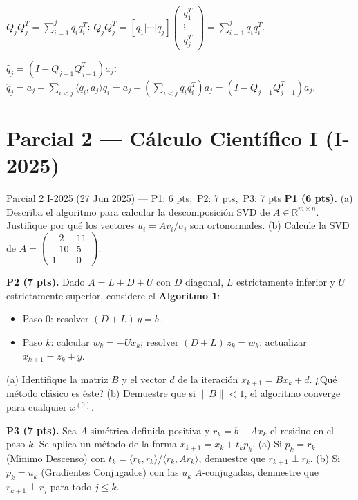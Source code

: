 \documentclass[11pt,a4paper]{article}
\begin{document}
\textbf{$Q_jQ_j^T = \sum_{i=1}^j q_iq_i^T$:}
$Q_jQ_j^T=[q_1|\cdots|q_j]\begin{pmatrix}q_1^T\\\vdots\\q_j^T\end{pmatrix}
=\sum_{i=1}^j q_iq_i^T$.

\textbf{$\hat{q}_j = (I-Q_{j-1}Q_{j-1}^T)a_j$:}
$\hat{q}_j = a_j - \sum_{i<j}\langle q_i,a_j\rangle q_i
= a_j - \left(\sum_{i<j}q_iq_i^T\right)a_j = (I-Q_{j-1}Q_{j-1}^T)a_j$.

\section{Parcial 2 --- Cálculo Científico I (I-2025)}
\label{sec:parcial2025}

\begin{examen}{Parcial 2 I-2025 (27 Jun 2025) --- P1: 6 pts,\ P2: 7 pts,\ P3: 7 pts}
\textbf{P1 (6 pts).} (a) Describa el algoritmo para calcular la descomposición SVD de $A\in\mathbb{R}^{m\times n}$. Justifique por qué los vectores $u_i=Av_i/\sigma_i$ son ortonormales. (b) Calcule la SVD de $A=\begin{pmatrix}-2&11\\-10&5\\1&0\end{pmatrix}$.

\smallskip\textbf{P2 (7 pts).} Dado $A=L+D+U$ con $D$ diagonal, $L$ estrictamente inferior y $U$ estrictamente superior, considere el \textbf{Algoritmo 1}:
\begin{itemize}[noitemsep]
  \item Paso 0: resolver $(D+L)\,y=b$.
  \item Paso $k$: calcular $w_k=-Ux_k$; resolver $(D+L)\,z_k=w_k$; actualizar $x_{k+1}=z_k+y$.
\end{itemize}
(a) Identifique la matriz $B$ y el vector $d$ de la iteración $x_{k+1}=Bx_k+d$. ¿Qué método clásico es éste? (b) Demuestre que si $\|B\|<1$, el algoritmo converge para cualquier $x^{(0)}$.

\smallskip\textbf{P3 (7 pts).} Sea $A$ simétrica definida positiva y $r_k=b-Ax_k$ el residuo en el paso $k$. Se aplica un método de la forma $x_{k+1}=x_k+t_kp_k$. (a) Si $p_k=r_k$ (Mínimo Descenso) con $t_k=\langle r_k,r_k\rangle/\langle r_k,Ar_k\rangle$, demuestre que $r_{k+1}\perp r_k$. (b) Si $p_k=u_k$ (Gradientes Conjugados) con las $u_k$ $A$-conjugadas, demuestre que $r_{k+1}\perp r_j$ para todo $j\le k$.
\end{examen}
\end{document}
